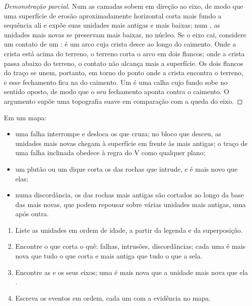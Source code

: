\begin{proof}[Demonstração parcial]
Num  as camadas sobem em direção ao eixo, de modo que uma superfície de erosão aproximadamente horizontal corta mais fundo a sequência ali e expõe suas unidades mais antigas e mais baixas; num , as unidades mais novas se preservam mais baixas, no núcleo. Se o eixo cai, considere um contato de um : é um arco cuja crista desce ao longo do caimento. Onde a crista está acima do terreno, o terreno corta o arco em dois flancos; onde a crista passa abaixo do terreno, o contato não alcança mais a superfície. Os dois flancos do traço se unem, portanto, em torno do ponto onde a crista encontra o terreno, e esse fechamento fica na  do caimento. Um  é uma calha cujo fundo sobe no sentido oposto, de modo que o seu fechamento aponta contra o caimento. O argumento supõe uma topografia suave em comparação com a queda do eixo.
\end{proof}

\begin{proposition}\label{prop:b1:geological-maps:cuts}
Em um mapa:
\begin{itemize}
  \item uma falha interrompe e desloca os  que cruza; no bloco que desceu, as unidades mais novas chegam à superfície em frente às mais antigas; o traço de uma falha inclinada obedece à regra do V como qualquer plano;
  \item um plutão ou um dique corta os  das rochas que intrude, e é mais novo que elas;
  \item numa discordância, os  das rochas mais antigas são cortados ao longo da base das mais novas, que podem repousar sobre várias unidades mais antigas, uma após outra.
\end{itemize}
\end{proposition}

\begin{method}\label{met:b1:geological-maps:history}
\begin{enumerate}
  \item Liste as unidades em ordem de idade, a partir da legenda e da superposição.
  \item Encontre o que corta o quê: falhas, intrusões, discordâncias; cada uma é mais nova que tudo o que corta e mais antiga que tudo o que a sela.
  \item Encontre as  e os seus eixos; uma  é mais nova que a unidade mais nova que ela .
  \item Escreva os eventos em ordem, cada um com a evidência no mapa.
\end{enumerate}
\end{method}

